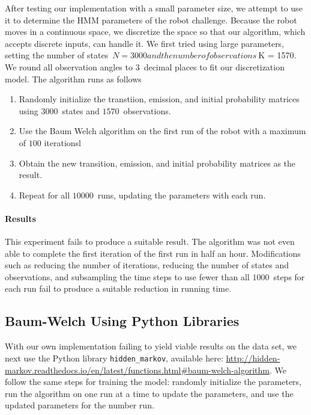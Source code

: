 \documentclass[twoside]{article}
\begin{document}
After testing our implementation with a small parameter size, we attempt to use it to determine the HMM parameters of the robot challenge.
Because the robot moves in a continuous space, we discretize the space so that our algorithm, which accepts discrete inputs, can handle it.
We first tried using large parameters, setting the number of states~${N = \num{3000}} and the number of observations~${K = \num{1570}}.
We round all observation angles to $3$~decimal places to fit our discretization model.
The algorithm runs as follows
\begin{enumerate}
  \item Randomly initialize the transtiion, emission, and initial probability matrices using $\num{3000}$~states and $\num{1570}$~observations.
  \item Use the Baum Welch algorithm on the first run of the robot with a maximum of $\num{100}$ iterationsl
  \item Obtain the new transition, emission, and initial probability matrices as the result.
  \item Repeat for all $\num{10000}$~runs, updating the parameters with each run.
\end{enumerate}

\paragraph{Results}

This experiment fails to produce a suitable result.
The algorithm was not even able to complete the first iteration of the first run in half an hour.
Modifications such as reducing the number of iterations, reducing the number of states and observations, and subsampling the time steps to use fewer than all $\num{1000}$~steps for each run fail to produce a suitable reduction in running time.

\subsection{Baum-Welch Using Python Libraries}
\label{sec:bw-python-libs}


With our own implementation failing to yield viable results on the data set, we next use the Python library \texttt{\small hidden\_markov}, available here: {\small\url{http://hidden-markov.readthedocs.io/en/latest/functions.html#baum-welch-algorithm}}.
We follow the same steps for training the model: randomly initialize the parameters, run the algorithm on one run at a time to update the parameters, and use the updated parameters for the number run.
\end{document}
